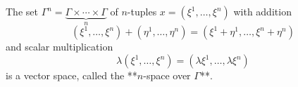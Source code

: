 The set $\Gamma^n = \underbrace{\Gamma \times \cdots \times \Gamma}_{n}$ of $n$-tuples $x = (\xi^1, \ldots, \xi^n)$ with addition
$$(\xi^1, \ldots, \xi^n) + (\eta^1, \ldots, \eta^n) = (\xi^1 + \eta^1, \ldots, \xi^n + \eta^n)$$
and scalar multiplication
$$\lambda(\xi^1, \ldots, \xi^n) = (\lambda \xi^1, \ldots, \lambda \xi^n)$$
is a vector space, called the **$n$-space over $\Gamma$**.
